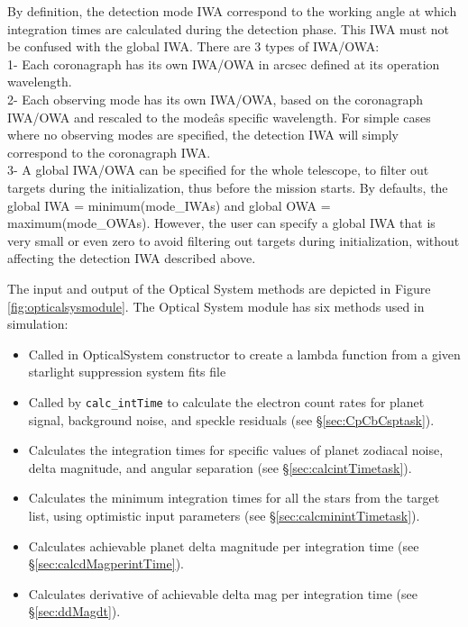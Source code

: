 \documentclass[cleanfoot]{asme2ej}
\newcommand{\reffig}[1]{Figure \ref{#1}}
\begin{document}
By definition, the detection mode IWA correspond to the working angle at which integration times are calculated during the detection phase. This IWA must not be confused with the global IWA. There are 3 types of IWA/OWA:\\
1- Each coronagraph has its own IWA/OWA in arcsec defined at its operation wavelength.\\
2- Each observing mode has its own IWA/OWA, based on the coronagraph IWA/OWA and rescaled to the modeâs specific wavelength. For simple cases where no observing modes are specified, the detection IWA will simply correspond to the coronagraph IWA.\\
3- A global IWA/OWA can be specified for the whole telescope, to filter out targets during the initialization, thus before the mission starts. By defaults, the global IWA = minimum(mode\_IWAs) and global OWA = maximum(mode\_OWAs). However, the user can specify a global IWA that is very small or even zero to avoid filtering out targets during initialization, without affecting the detection IWA described above.

The input and output of the Optical System methods are depicted in \reffig{fig:opticalsysmodule}. The Optical System module has six methods used in simulation:
\begin{itemize}[leftmargin=2in,font={\ttfamily}]
    \item[\texttt get\_coro\_param] Called in OpticalSystem constructor to create a lambda function from a given starlight suppression system fits file
    \item[\texttt Cp\_Cb\_Csp] Called by \verb+calc_intTime+ to calculate the electron count rates for planet signal, background noise, and speckle residuals (see \S\ref{sec:CpCbCsptask}).
    \item[\texttt calc\_intTime] Calculates the integration times for specific values of planet zodiacal noise, delta magnitude, and angular separation (see \S\ref{sec:calcintTimetask}).
    \item[\texttt calc\_minintTime] Calculates the minimum integration times for all the stars from the target list, using optimistic input parameters  (see \S\ref{sec:calcminintTimetask}).
    \item[\texttt calc\_dMag\_per\_intTime] Calculates achievable planet delta magnitude per integration time (see \S\ref{sec:calcdMagperintTime}).
    \item[\texttt ddMag\_dt] Calculates derivative of achievable delta mag per integration time (see \S\ref{sec:ddMagdt}).
\end{itemize}
\end{document}
